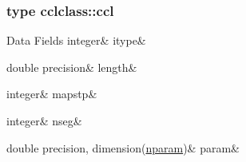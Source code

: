\subsubsection{type cclclass\+::ccl}
\begin{DoxyFields}{Data Fields}
\mbox{\label{namespacecclclass_ac0907eebcd93b9aa41c33858f394496d}} 
integer&
itype&
\\
\hline

\mbox{\label{namespacecclclass_a128d51138685ec33b8c0c7f6bd89dc81}} 
double precision&
length&
\\
\hline

\mbox{\label{namespacecclclass_a5d663b5eeafc5a924cfe6383143f9b0a}} 
integer&
mapstp&
\\
\hline

\mbox{\label{namespacecclclass_a37e0a279ff69258948ddecf0a4c78045}} 
integer&
nseg&
\\
\hline

\mbox{\label{namespacecclclass_a4b800d069f005c436b2295924f8f7bb9}} 
double precision, dimension(\mbox{\hyperlink{namespacecclclass_adeb399ff41e54cda7bdefa51063c0de6}{nparam}})&
param&
\\
\hline

\end{DoxyFields}
